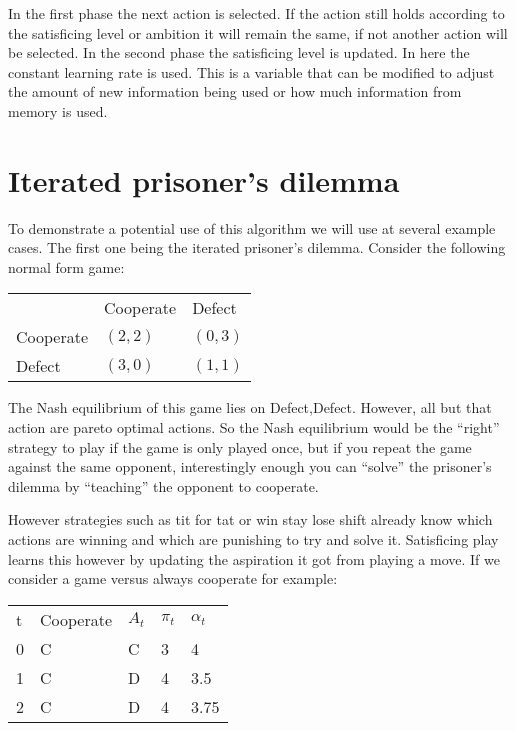 \toReview In the first phase the next action is selected. If the action still holds
according to the satisficing level or ambition it will remain the same, if not another
action will be selected. In the second phase the satisficing level is updated.
In here the constant learning rate is used. This is a variable that can be
modified to adjust the amount of new information being used or how much
information from memory is used.


\section{Iterated prisoner's dilemma}
\drafting
To demonstrate a potential use of this algorithm we will use at several example
cases. The first one being the iterated prisoner's dilemma. Consider
the following normal form game:

\begin{tabular}{lll}
            & Cooperate   & Defect \\
  Cooperate & $(2,2)$     & $(0,3)$  \\
  Defect    & $(3,0)$     & $(1,1)$  \\
\end{tabular}

\drafting The Nash equilibrium of this game lies on Defect,Defect. However, all but
that action are pareto optimal actions. So the Nash equilibrium would be the
``right'' strategy to play if the game is only played once, but if you repeat
the game against the same opponent, interestingly enough you can ``solve''
the prisoner's dilemma by ``teaching'' the opponent to cooperate.

\drafting However strategies such as tit for tat or win stay lose shift already know
which actions are winning and which are punishing to try and solve it.
Satisficing play learns this however by updating the aspiration it got from
playing a move. If we consider a game versus always cooperate for example:

\begin{tabular}{lllll}
    t & Cooperate & $A_t$ & $\pi_t$ & $\alpha_t$ \\
    0 & C     & C    & 3       & 4 \\
    1 & C     & D    & 4       & 3.5 \\
    2 & C     & D    & 4       & 3.75 \\
\end{tabular}

